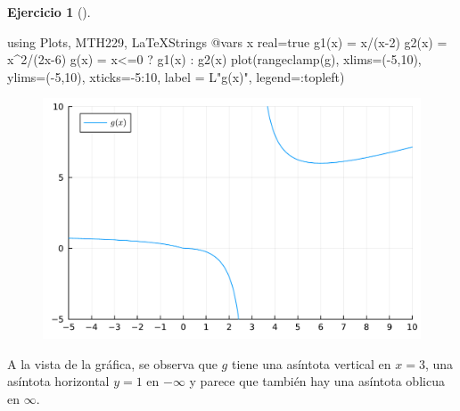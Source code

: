 \documentclass[
  a4paper,
]{scrreport}
\newenvironment{Shaded}{\begin{snugshade}}{\end{snugshade}}
\newcommand{\BuiltInTok}[1]{\textcolor[rgb]{0.00,0.23,0.31}{#1}}
\newcommand{\ConstantTok}[1]{\textcolor[rgb]{0.56,0.35,0.01}{#1}}
\newcommand{\FloatTok}[1]{\textcolor[rgb]{0.68,0.00,0.00}{#1}}
\newcommand{\FunctionTok}[1]{\textcolor[rgb]{0.28,0.35,0.67}{#1}}
\newcommand{\ImportTok}[1]{\textcolor[rgb]{0.00,0.46,0.62}{#1}}
\newcommand{\NormalTok}[1]{\textcolor[rgb]{0.00,0.23,0.31}{#1}}
\newcommand{\OperatorTok}[1]{\textcolor[rgb]{0.37,0.37,0.37}{#1}}
\newcommand{\PreprocessorTok}[1]{\textcolor[rgb]{0.68,0.00,0.00}{#1}}
\newcommand{\StringTok}[1]{\textcolor[rgb]{0.13,0.47,0.30}{#1}}
\theoremstyle{definition}
\newtheorem{exercise}{Ejercicio}[chapter]
\theoremstyle{remark}
\begin{document}
\begin{exercise}[]
\begin{tcolorbox}
\begin{Shaded}
\begin{Highlighting}[]
\ImportTok{using} \BuiltInTok{Plots}\NormalTok{, }\BuiltInTok{MTH229}\NormalTok{, }\BuiltInTok{LaTeXStrings}
\PreprocessorTok{@vars}\NormalTok{ x real}\OperatorTok{=}\ConstantTok{true}
\FunctionTok{g1}\NormalTok{(x) }\OperatorTok{=}\NormalTok{ x}\OperatorTok{/}\NormalTok{(x}\OperatorTok{{-}}\FloatTok{2}\NormalTok{)}
\FunctionTok{g2}\NormalTok{(x) }\OperatorTok{=}\NormalTok{ x}\OperatorTok{\^{}}\FloatTok{2}\OperatorTok{/}\NormalTok{(}\FloatTok{2}\NormalTok{x}\OperatorTok{{-}}\FloatTok{6}\NormalTok{)}
\FunctionTok{g}\NormalTok{(x) }\OperatorTok{=}\NormalTok{ x}\OperatorTok{\textless{}=}\FloatTok{0}\NormalTok{ ? }\FunctionTok{g1}\NormalTok{(x) }\OperatorTok{:} \FunctionTok{g2}\NormalTok{(x)}
\FunctionTok{plot}\NormalTok{(}\FunctionTok{rangeclamp}\NormalTok{(g), xlims}\OperatorTok{=}\NormalTok{(}\OperatorTok{{-}}\FloatTok{5}\NormalTok{,}\FloatTok{10}\NormalTok{), ylims}\OperatorTok{=}\NormalTok{(}\OperatorTok{{-}}\FloatTok{5}\NormalTok{,}\FloatTok{10}\NormalTok{), xticks}\OperatorTok{={-}}\FloatTok{5}\OperatorTok{:}\FloatTok{10}\NormalTok{, label }\OperatorTok{=}\NormalTok{ L}\StringTok{"g(x)"}\NormalTok{, legend}\OperatorTok{=:}\NormalTok{topleft)}
\end{Highlighting}
\end{Shaded}

\begin{figure}[H]

{\centering \includegraphics{./limites_files/figure-pdf/cell-23-output-1.pdf}

}

\end{figure}

A la vista de la gráfica, se observa que \(g\) tiene una asíntota
vertical en \(x=3\), una asíntota horizontal \(y=1\) en \(-\infty\) y
parece que también hay una asíntota oblicua en \(\infty\).


\end{tcolorbox}
\end{exercise}
\end{document}
